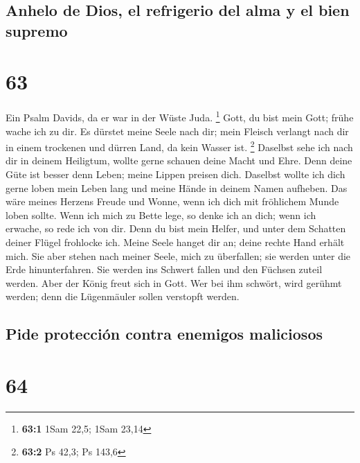 \hypertarget{anhelo-de-dios-el-refrigerio-del-alma-y-el-bien-supremo}{%
\subsection{Anhelo de Dios, el refrigerio del alma y el bien
supremo}\label{anhelo-de-dios-el-refrigerio-del-alma-y-el-bien-supremo}}

\hypertarget{section-62}{%
\section{63}\label{section-62}}

 Ein Psalm Davids, da er war in der Wüste Juda.
\footnote{\textbf{63:1} 1Sam 22,5; 1Sam 23,14}  Gott, du
bist mein Gott; frühe wache ich zu dir. Es dürstet meine Seele nach dir;
mein Fleisch verlangt nach dir in einem trockenen und dürren Land, da
kein Wasser ist. \footnote{\textbf{63:2} Ps 42,3; Ps 143,6}
 Daselbst sehe ich nach dir in deinem Heiligtum, wollte
gerne schauen deine Macht und Ehre.  Denn deine Güte ist
besser denn Leben; meine Lippen preisen dich.  Daselbst
wollte ich dich gerne loben mein Leben lang und meine Hände in deinem
Namen aufheben.  Das wäre meines Herzens Freude und Wonne,
wenn ich dich mit fröhlichem Munde loben sollte.  Wenn ich
mich zu Bette lege, so denke ich an dich; wenn ich erwache, so rede ich
von dir.  Denn du bist mein Helfer, und unter dem Schatten
deiner Flügel frohlocke ich.  Meine Seele hanget dir an;
deine rechte Hand erhält mich.  Sie aber stehen nach
meiner Seele, mich zu überfallen; sie werden unter die Erde
hinunterfahren.  Sie werden ins Schwert fallen und den
Füchsen zuteil werden.  Aber der König freut sich in
Gott. Wer bei ihm schwört, wird gerühmt werden; denn die Lügenmäuler
sollen verstopft werden.

\hypertarget{pide-protecciuxf3n-contra-enemigos-maliciosos}{%
\subsection{Pide protección contra enemigos
maliciosos}\label{pide-protecciuxf3n-contra-enemigos-maliciosos}}

\hypertarget{section-63}{%
\section{64}\label{section-63}}

